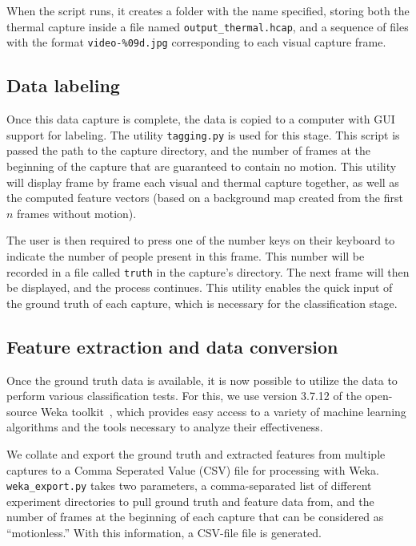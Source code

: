 \documentclass[../thesis/thesis.tex]{subfiles}
\begin{document}
When the script runs, it creates a folder with the name specified, storing both the thermal capture inside a file named \texttt{output\_thermal.hcap}, and a sequence of files with the format \texttt{video-\%09d.jpg} corresponding to each visual capture frame.

\subsection{Data labeling}
\label{subsec:datalabelling}
Once this data capture is complete, the data is copied to a computer with GUI support for labeling. The utility \texttt{tagging.py} is used for this stage. This script is passed the path to the capture directory, and the number of frames at the beginning of the capture that are guaranteed to contain no motion. This utility will display frame by frame each visual and thermal capture together, as well as the computed feature vectors (based on a background map created from the first $n$ frames without motion).

The user is then required to press one of the number keys on their keyboard to indicate the number of people present in this frame. This number will be recorded in a file called \texttt{truth} in the capture's directory. The next frame will then be displayed, and the process continues. This utility enables the quick input of the ground truth of each capture, which is necessary for the classification stage.

\subsection{Feature extraction and data conversion}

Once the ground truth data is available, it is now possible to utilize the data to perform various classification tests. For this, we use version 3.7.12 of the open-source Weka toolkit~\cite{Weka}, which provides easy access to a variety of machine learning algorithms and the tools necessary to analyze their effectiveness.

We collate and export the ground truth and extracted features from multiple captures to a Comma Seperated Value (CSV) file for processing with Weka. \texttt{weka\_export.py} takes two parameters, a comma-separated list of different experiment directories to pull ground truth and feature data from, and the number of frames at the beginning of each capture that can be considered as ``motionless.'' With this information, a CSV-file file is generated.
\end{document}
